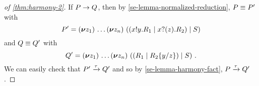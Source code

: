 \begin{proof}[of \cref{thm:harmony-2}]
  If \( P \rightarrow Q \), then by \cref{se-lemma-normalized-reduction}, \( P \equiv P' \) with
  \begin{equation*}
    P' = (\bm{\nu} z_1)~\!\dots (\bm{\nu} z_n)~((x ! y . R_1 \mid x ? (z) . R_2) \mid S)
  \end{equation*}
  and \( Q \equiv Q' \) with
  \begin{equation*}
    Q' = (\bm{\nu} z_1)~\!\dots (\bm{\nu} z_n)~((R_1 \mid R_2\{y/z\}) \mid S) \ .
  \end{equation*}
  We can easily check that \( P' \xrightarrow{\tau} Q' \) and so by \cref{se-lemma-harmony-fact}, \( P \xrightarrow{\tau} Q' \).
\end{proof}
